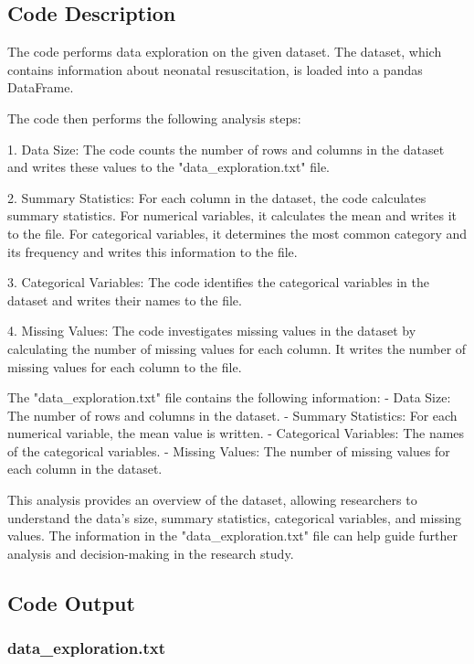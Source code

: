 \documentclass[11pt]{article}
\begin{document}
\subsection{Code Description}

The code performs data exploration on the given dataset. The dataset, which contains information about neonatal resuscitation, is loaded into a pandas DataFrame. 

The code then performs the following analysis steps:

1. Data Size: The code counts the number of rows and columns in the dataset and writes these values to the "data\_exploration.txt" file.

2. Summary Statistics: For each column in the dataset, the code calculates summary statistics. For numerical variables, it calculates the mean and writes it to the file. For categorical variables, it determines the most common category and its frequency and writes this information to the file.

3. Categorical Variables: The code identifies the categorical variables in the dataset and writes their names to the file.

4. Missing Values: The code investigates missing values in the dataset by calculating the number of missing values for each column. It writes the number of missing values for each column to the file.

The "data\_exploration.txt" file contains the following information:
- Data Size: The number of rows and columns in the dataset.
- Summary Statistics: For each numerical variable, the mean value is written.
- Categorical Variables: The names of the categorical variables.
- Missing Values: The number of missing values for each column in the dataset.

This analysis provides an overview of the dataset, allowing researchers to understand the data's size, summary statistics, categorical variables, and missing values. The information in the "data\_exploration.txt" file can help guide further analysis and decision-making in the research study.

\subsection{Code Output}

\subsubsection*{data\_exploration.txt}
\end{document}
